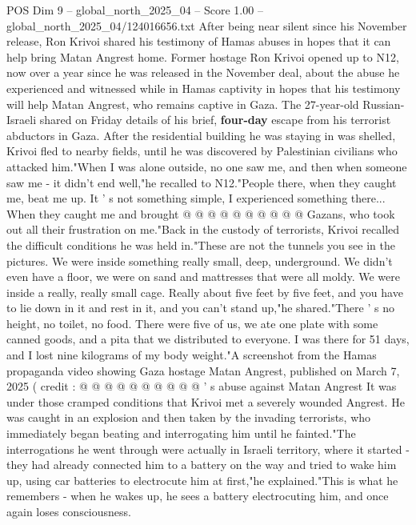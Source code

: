 \begin{textsample}{POS Dim 9 – global\_north\_2025\_04 – Score 1.00 – global\_north\_2025\_04/124016656.txt}  \label{ex:f9_pos_424}
After being near silent since his November release, Ron Krivoi shared his testimony of Hamas abuses in hopes that it can help bring Matan Angrest home.
Former hostage Ron Krivoi opened up to N12, now over a year since he was released in the November deal, about the abuse he experienced and witnessed while in Hamas captivity in hopes that his testimony will help Matan Angrest, who remains captive in Gaza.
The 27-year-old Russian-Israeli shared on Friday details of his brief, \textbf{four-day} escape from his terrorist abductors in Gaza.
After the residential building he was staying in was shelled, Krivoi fled to nearby fields, until he was discovered by Palestinian civilians who attacked him."When I was alone outside, no one saw me, and then when someone saw me - it didn't end well,"he recalled to N12."People there, when they caught me, beat me up.
It ' s not something simple, I experienced something there...
When they caught me and brought @ @ @ @ @ @ @ @ @ @ Gazans, who took out all their frustration on me."Back in the custody of terrorists, Krivoi recalled the difficult conditions he was held in."These are not the tunnels you see in the pictures.
We were inside something really small, deep, underground.
We didn't even have a floor, we were on sand and mattresses that were all moldy.
We were inside a really, really small cage.
Really about five feet by five feet, and you have to lie down in it and rest in it, and you can't stand up,"he shared."There ' s no height, no toilet, no food.
There were five of us, we ate one plate with some canned goods, and a pita that we distributed to everyone.
I was there for 51 days, and I lost nine kilograms of my body weight."A screenshot from the Hamas propaganda video showing Gaza hostage Matan Angrest, published on March 7, 2025 ( credit : @ @ @ @ @ @ @ @ @ @ ' s abuse against Matan Angrest It was under those cramped conditions that Krivoi met a severely wounded Angrest.
He was caught in an explosion and then taken by the invading terrorists, who immediately began beating and interrogating him until he fainted."The interrogations he went through were actually in Israeli territory, where it started - they had already connected him to a battery on the way and tried to wake him up, using car batteries to electrocute him at first,"he explained."This is what he remembers - when he wakes up, he sees a battery electrocuting him, and once again loses consciousness.

\end{textsample}
